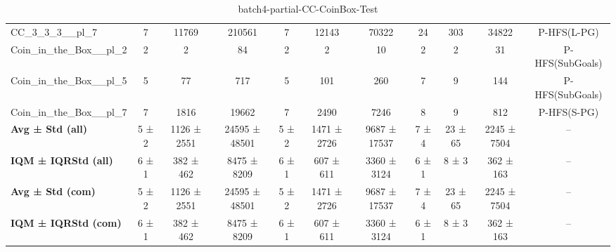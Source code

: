 \begin{table}[!ht]
\begin{tabular}{l|ccc|ccc|cccc}
CC\_3\_3\_3\_\_pl\_7 & 7 & 11769 & 210561 & 7 & 12143 & 70322 & 24 & 303 & 34822 & P-HFS(L-PG) \\
Coin\_in\_the\_Box\_\_pl\_2 & 2 & 2 & 84 & 2 & 2 & 10 & 2 & 2 & 31 & P-HFS(SubGoals) \\
Coin\_in\_the\_Box\_\_pl\_5 & 5 & 77 & 717 & 5 & 101 & 260 & 7 & 9 & 144 & P-HFS(SubGoals) \\
Coin\_in\_the\_Box\_\_pl\_7 & 7 & 1816 & 19662 & 7 & 2490 & 7246 & 8 & 9 & 812 & P-HFS(S-PG) \\
\hline
\textbf{Avg ± Std (all)} & 5 ± 2 & 1126 ± 2551 & 24595 ± 48501 & 5 ± 2 & 1471 ± 2726 & 9687 ± 17537 & 7 ± 4 & 23 ± 65 & 2245 ± 7504 & -- \\
\textbf{IQM ± IQRStd (all)} & 6 ± 1 & 382 ± 462 & 8475 ± 8209 & 6 ± 1 & 607 ± 611 & 3360 ± 3124 & 6 ± 1 & 8 ± 3 & 362 ± 163 & -- \\
\textbf{Avg ± Std (com)} & 5 ± 2 & 1126 ± 2551 & 24595 ± 48501 & 5 ± 2 & 1471 ± 2726 & 9687 ± 17537 & 7 ± 4 & 23 ± 65 & 2245 ± 7504 & -- \\
\textbf{IQM ± IQRStd (com)} & 6 ± 1 & 382 ± 462 & 8475 ± 8209 & 6 ± 1 & 607 ± 611 & 3360 ± 3124 & 6 ± 1 & 8 ± 3 & 362 ± 163 & -- \\
\end{tabular}
\caption{batch4-partial-CC-CoinBox-Test}
\label{tab:batch4_partial_CC-CoinBox_comparison_test}
\end{table}

